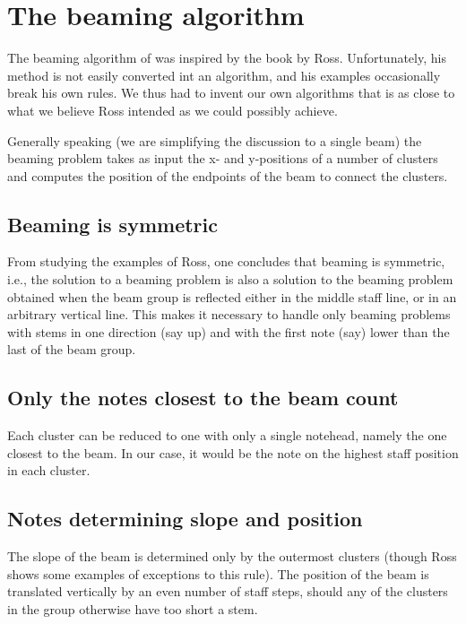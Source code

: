\chapter{The beaming algorithm}

The beaming algorithm of {\gs} was inspired by the book by Ross.
Unfortunately, his method is not easily converted int an algorithm,
and his examples occasionally break his own rules.  We thus had to
invent our own algorithms that is as close to what we believe Ross
intended as we could possibly achieve. 

Generally speaking (we are simplifying the discussion to a single
beam) the beaming problem takes as input the x- and y-positions of a
number of clusters and computes the position of the endpoints of the
beam to connect the clusters. 

\section{Beaming is symmetric}

From studying the examples of Ross, one concludes that beaming
is symmetric, i.e., the solution to a beaming problem is also a
solution to the beaming problem obtained when the beam group is
reflected either in the middle staff line, or in an arbitrary vertical
line.  This makes it necessary to handle only beaming problems with
stems in one direction (say up) and with the first note (say) lower
than the last of the beam group. 

\section{Only the notes closest to the beam count}

Each cluster can be reduced to one with only a single notehead, namely
the one closest to the beam.  In our case, it would be the note on the
highest staff position in each cluster.

\section{Notes determining slope and position}

The slope of the beam is determined only by the outermost clusters
(though Ross shows some examples of exceptions to this rule).  The
position of the beam is translated vertically by an even number of
staff steps, should any of the clusters in the group otherwise have
too short a stem. 

